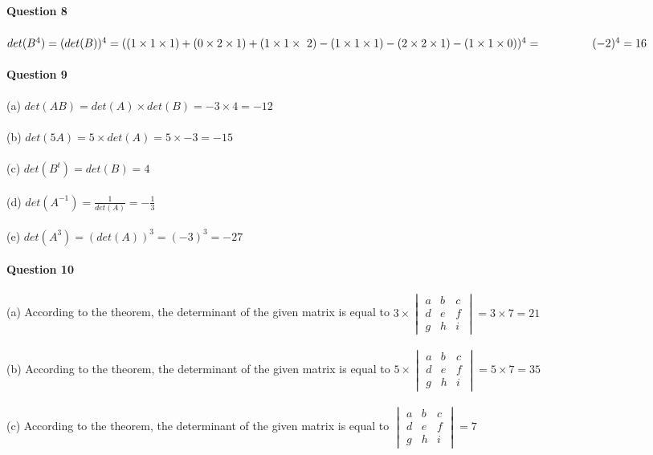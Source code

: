 \documentclass{article}
\begin{document}
\\\\
\noindent\textbf{Question 8}\\\\
\indent\indent\indent $det(B^4) = (det(B))^4 = ((1 \times 1 \times 1) + (0 \times 2 \times 1) + (1 \times 1 \times\ 2) - (1 \times 1 \times 1) - (2 \times 2 \times 1) - (1 \times 1 \times 0))^4 = \\\\
\indent\indent\indent(-2)^4 = 16$
\\\\
\noindent\textbf{Question 9}
\\\\
\indent(a)\indent
$ det(AB) = det(A) \times det(B) = -3 \times 4 = -12 $
\\\\
\indent(b)\indent
$ det(5A) = 5 \times det(A) = 5 \times -3 = -15 $
\\\\
\indent(c)\indent
$ det(B^t) = det(B) = 4 $
\\\\
\indent(d)\indent
$ det(A^{-1}) = \frac{1}{det(A)} = -\frac{1}{3} $
\\\\
\indent(e)\indent
$ det(A^3) = (det(A))^3 = (-3)^3 = -27 $
\\\\
\noindent\textbf{Question 10}
\\\\
\indent(a)\indent
According to the theorem, the determinant of the given matrix is equal to $3 \times \begin{vmatrix}a&b&c\\d&e&f\\g&h&i\end{vmatrix} = 3 \times 7 = 21$  
\\\\
\indent(b)\indent
According to the theorem, the determinant of the given matrix is equal to $5 \times \begin{vmatrix}a&b&c\\d&e&f\\g&h&i\end{vmatrix} = 5 \times 7 = 35$  
\\\\
\indent(c)\indent
According to the theorem, the determinant of the given matrix is equal to $\begin{vmatrix}a&b&c\\d&e&f\\g&h&i\end{vmatrix} = 7$
\end{document}
